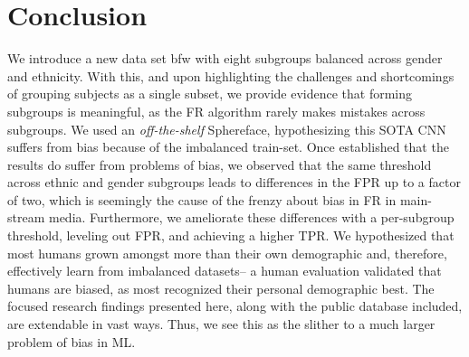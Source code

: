 \documentclass[10pt,twocolumn,letterpaper]{article}
\begin{document}
\section{Conclusion}
We introduce a new data set \gls{bfw} with eight subgroups balanced across gender and ethnicity. With this, and upon highlighting the challenges and shortcomings of grouping subjects as a single subset, we provide evidence that forming subgroups is meaningful, as the FR algorithm rarely makes mistakes across subgroups. We used an \textit{off-the-shelf} Sphereface, hypothesizing this SOTA CNN suffers from bias because of the imbalanced train-set. Once established that the results do suffer from problems of bias, we observed that the same threshold across ethnic and gender subgroups leads to differences in the FPR up to a factor of two, which is seemingly the cause of the frenzy about bias in FR in main-stream media. Furthermore, we ameliorate these differences with a per-subgroup threshold, leveling out FPR, and achieving a higher TPR. We hypothesized that most humans grown amongst more than their own demographic and, therefore, effectively learn from imbalanced datasets-- a human evaluation validated that humans are biased, as most recognized their personal demographic best. The focused research findings presented here, along with the public database included, are extendable in vast ways. Thus, we see this as the slither to a much larger problem of bias in ML.

% 
% 

{\small


}

% 
\end{document}
